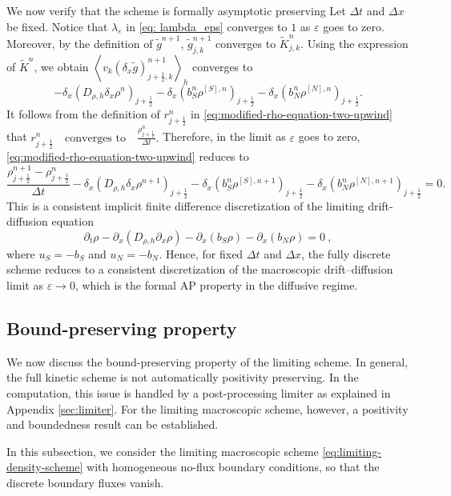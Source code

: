 \documentclass[11pt,twoside]{article}
\numberwithin{equation}{section}
\theoremstyle{plain}
\theoremstyle{nonumberplain}
\begin{document}
{We now verify that the scheme is formally asymptotic preserving
Let \(\Delta t\) and \(\Delta x\) be fixed. Notice that $\lambda_\varepsilon$ in \eqref{eq: lambda_eps}
 converges to \(1\) as \(\varepsilon\) goes to zero.
Moreover, by the definition of \(\widetilde g^{n+1}\),
\(\widetilde g_{j,k}^{n+1}\) converges to \(\widetilde K_{j,k}^{n}\).
Using the expression of \(\widetilde K^n\), we obtain \(\left\langle
v_k(\delta_x\widetilde g)_{j+\frac12,k}^{n+1}
\right\rangle_h\) converges to
\[
-\delta_x\left(D_{\rho,h}\delta_x\rho^n\right)_{j+\frac12}
-
\delta_x\left(b_S^n\rho^{[S],n}\right)_{j+\frac12}
-
\delta_x\left(b_N^n\rho^{[N],n}\right)_{j+\frac12}.
\]
It follows from the definition of \(r_{j+\frac12}^n\) in
\eqref{eq:modified-rho-equation-two-upwind} that
\(
r_{j+\frac12}^n
\quad\text{converges to}\quad
\frac{\rho_{j+\frac12}^n}{\Delta t}.
\)
Therefore, in the limit as \(\varepsilon\) goes to zero,
\eqref{eq:modified-rho-equation-two-upwind} reduces to
\begin{equation}\label{eq:limiting-density-scheme}
\frac{\rho_{j+\frac12}^{n+1}-\rho_{j+\frac12}^{n}}{\Delta t}
-
\delta_x\left(
D_{\rho,h}\delta_x\rho^{n+1}
\right)_{j+\frac12}
-
\delta_x\left(
b_S^n\rho^{[S],n+1}
\right)_{j+\frac12}
-
\delta_x\left(
b_N^n\rho^{[N],n+1}
\right)_{j+\frac12}
=0 .
\end{equation}
This is a consistent implicit finite difference discretization of the
limiting drift-diffusion equation
\[
\partial_t\rho
-
\partial_x\left(D_{\rho,h}\partial_x\rho\right)
-
\partial_x\left(b_S\rho\right)
-
\partial_x\left(b_N\rho\right)
=0\ ,
\]
where \(u_S=-b_S\) and \(u_N=-b_N\).
Hence, for fixed $\Delta t$ and $\Delta x$, the fully discrete scheme reduces to a consistent discretization of the macroscopic drift–diffusion limit as $\varepsilon\to0$, which is the formal AP property in the diffusive regime.

\subsection{Bound-preserving property}

We now discuss the bound-preserving property of the limiting scheme.
In general, the full kinetic scheme is not automatically positivity
preserving. In the computation, this issue is handled by a post-processing
limiter as explained in Appendix \ref{sec:limiter}. For the limiting macroscopic scheme, however, a positivity and
boundedness result can be established.

In this subsection, we consider the limiting macroscopic scheme \eqref{eq:limiting-density-scheme} with
homogeneous no-flux boundary conditions, so that the discrete boundary
fluxes vanish. 

}
\end{document}
